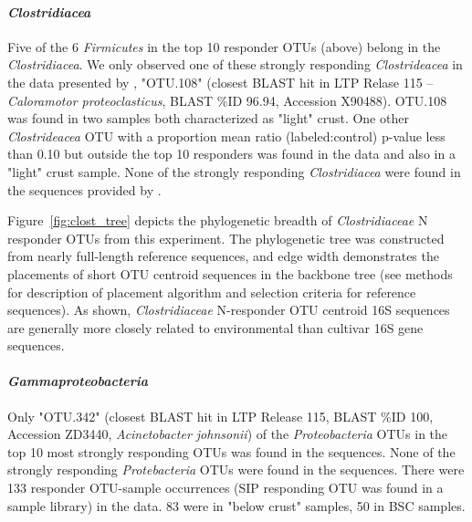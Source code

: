 \paragraph{\textit{Clostridiacea}}
Five of the 6 \textit{Firmicutes} in the top 10 responder OTUs (above) belong
in the \textit{Clostridiacea}. We only observed one of these strongly
responding
\textit{Clostrideacea} in the data presented by \citet{Garcia_Pichel_2013},
"OTU.108" (closest BLAST hit in LTP Relase 115 -- \textit{Caloramotor
proteoclasticus}, BLAST \%ID 96.94, Accession X90488). OTU.108 was found in two
samples both characterized as "light" crust. One other \textit{Clostrideacea}
OTU with a proportion mean ratio (labeled:control) p-value less than 0.10 but
outside the top 10 responders was found in the \citet{Garcia_Pichel_2013} data
and also in a "light" crust sample. None of the strongly responding
\textit{Clostridiacea} were found in the sequences provided by
\citet{Steven_2013}.

Figure~\ref{fig:clost_tree} depicts the phylogenetic breadth of
\textit{Clostridiaceae} N responder OTUs from this experiment. The phylogenetic
tree was constructed from nearly full-length reference sequences, and edge
width demonstrates the placements of short OTU centroid sequences in the
backbone tree (see methods for description of placement algorithm and selection
criteria for reference sequences). As shown, \textit{Clostridiaceae}
N-responder OTU centroid 16S sequences are generally more closely related to
environmental than cultivar 16S gene sequences.   

\paragraph{\textit{Gammaproteobacteria}} Only "OTU.342" (closest BLAST hit in
LTP Release 115, BLAST \%ID 100, Accession ZD3440, \textit{Acinetobacter
johnsonii}) of the \textit{Proteobacteria} OTUs in the top 10 most strongly
responding OTUs was found in the \citet{Garcia_Pichel_2013} sequences. None of
the strongly responding \textit{Protebacteria} OTUs were found in the
\citet{Steven_2013} sequences. There were 133 responder OTU-sample occurrences
(SIP responding OTU was found in a sample library) in the \citet{Steven_2013}
data. 83 were in "below crust" samples, 50 in BSC samples.

